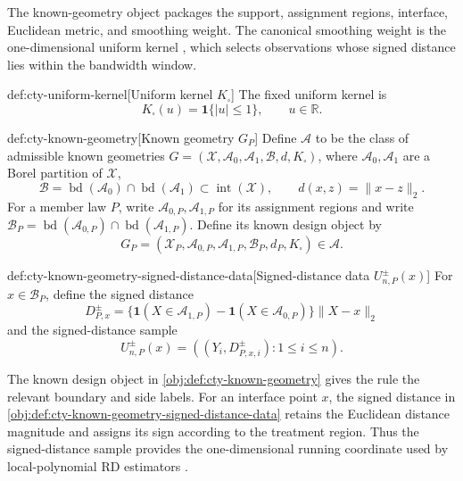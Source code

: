 The known-geometry object packages the support, assignment regions, interface, Euclidean metric, and smoothing weight. The canonical smoothing weight is the one-dimensional uniform kernel , which selects observations whose signed distance lies within the bandwidth window.

\begin{definitionv}{def:cty-uniform-kernel}[Uniform kernel \(K_\square\)]
The fixed uniform kernel is
\[
K_\square(u)=\mathbf 1\{|u|\leq1\},
\qquad u\in\mathbb R.
\]
\end{definitionv}

\begin{definitionv}{def:cty-known-geometry}[Known geometry \(G_P\)]
Define \(\mathcal A\) to be the class of admissible known geometries \(G=(\mathcal X,\mathcal A_0,\mathcal A_1,\mathcal B,d,K_\square)\), where \(\mathcal A_0,\mathcal A_1\) are a Borel partition of \(\mathcal X\),
\[
\mathcal B=\operatorname{bd}(\mathcal A_0)\cap\operatorname{bd}(\mathcal A_1)\subset\operatorname{int}(\mathcal X),
\qquad d(x,z)=\lVert x-z\rVert_2.
\]
For a member law \(P\), write \(\mathcal A_{0,P},\mathcal A_{1,P}\) for its assignment regions and write \(\mathcal B_P=\operatorname{bd}(\mathcal A_{0,P})\cap\operatorname{bd}(\mathcal A_{1,P})\). Define its known design object by
\[
G_P=(\mathcal X_P,\mathcal A_{0,P},\mathcal A_{1,P},\mathcal B_P,d_P,K_\square)\in\mathcal A.
\]
\end{definitionv}

\begin{definitionv}{def:cty-known-geometry-signed-distance-data}[Signed-distance data \(U^{\pm}_{n,P}(x)\)]
For \(x\in\mathcal B_P\), define the signed distance
\[
D^{\pm}_{P,x}
=
\{\mathbf 1(X\in\mathcal A_{1,P})-\mathbf 1(X\in\mathcal A_{0,P})\}
\lVert X-x\rVert_2
\]
and the signed-distance sample
\[
U^{\pm}_{n,P}(x)=((Y_i,D^{\pm}_{P,x,i}):1\leq i\leq n).
\]
\end{definitionv}

The known design object  in \cref{obj:def:cty-known-geometry} gives the rule the relevant boundary and side labels. For an interface point \(x\), the signed distance  in \cref{obj:def:cty-known-geometry-signed-distance-data} retains the Euclidean distance magnitude and assigns its sign according to the treatment region. Thus the signed-distance sample  provides the one-dimensional running coordinate used by local-polynomial RD estimators \citep{Fan1996,Ruppert1994,Calonico2014,Calonico2020,Imbens2019}.

